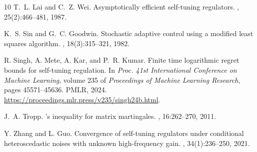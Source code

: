 \documentclass[11pt,reqno]{amsart}
\numberwithin{equation}{section}
\theoremstyle{definition}
\theoremstyle{remark}
\begin{document}
\begin{thebibliography}{10}
T.~L. Lai and C.~Z. Wei.
\newblock Asymptotically efficient self-tuning regulators.
, 25(2):466--481, 1987.

K.~S. Sin and G.~C. Goodwin.
\newblock Stochastic adaptive control using a modified least squares algorithm.
, 18(3):315--321, 1982.

R. Singh, A. Mete, A. Kar, and P.~R. Kumar.
\newblock Finite time logarithmic regret bounds for self-tuning regulation.
\newblock In {\em Proc. 41st International Conference on Machine Learning},
  volume 235 of {\em Proceedings of Machine Learning Research}, pages
  45571--45636. PMLR, 2024.
\newblock \url{https://proceedings.mlr.press/v235/singh24b.html}.

J.~A. Tropp.
's inequality for matrix martingales.
, 16:262--270, 2011.

Y. Zhang and L. Guo.
\newblock Convergence of self-tuning regulators under conditional
  heteroscedastic noises with unknown high-frequency gain.
, 34(1):236--250, 2021.

\end{thebibliography}
\end{document}
